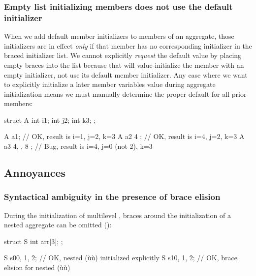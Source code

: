 \subsubsection{Empty list initializing members does not use the default initializer}

When we add default member initializers to members of an aggregate,
those initializers are in effect \emph{only} if that member has no corresponding
initializer in the braced initializer list. We cannot explicitly \emph{request}
the default value by placing empty braces into the list because that will
value-initialize the member with an empty initializer, not
use its default member initializer.  Any case where we want to explicitly initialize a later member variables value during aggregate initialization means we must manually determine the proper default for all prior members:

\begin{emcppslisting}[emcppsstandards={c++14}]
struct A 
{
     int i{1};
     int j{2};
     int k{3};
};

A a1{};            // OK, result is i=1, j=2,         k=3
A a2{ 4 };         // OK, result is i=4, j=2,         k=3
A a3{ 4, {}, 8 };  // Bug, result is i=4, j=0 (not 2), k=3
\end{emcppslisting}

\subsection[Annoyances]{Annoyances}\label{annoyances}

\subsubsection[Syntactical ambiguity in the presence of brace elision]{Syntactical ambiguity in the presence of brace elision}\label{syntactical-ambiguity-in-the-presence-of-brace-elision}

During the initialization of multilevel , braces
around the initialization of a nested aggregate can be omitted
():

\begin{emcppslisting}
struct S
{
    int arr[3];
};

S s0{{0, 1, 2}};  // OK, nested (ù{}ù) initialized explicitly
S s1{0, 1, 2};    // OK, brace elision for nested (ù{}ù)
\end{emcppslisting}

